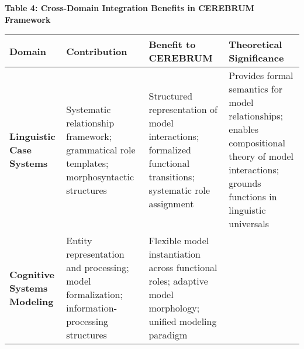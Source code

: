 \textbf{Table 4: Cross-Domain Integration Benefits in CEREBRUM
Framework}

\begin{longtable}[]{@{}llll@{}}
\toprule
\begin{minipage}[b]{0.10\columnwidth}\raggedright
Domain\strut
\end{minipage} & \begin{minipage}[b]{0.18\columnwidth}\raggedright
Contribution\strut
\end{minipage} & \begin{minipage}[b]{0.27\columnwidth}\raggedright
Benefit to CEREBRUM\strut
\end{minipage} & \begin{minipage}[b]{0.33\columnwidth}\raggedright
Theoretical Significance\strut
\end{minipage}\tabularnewline
\midrule
\endhead
\begin{minipage}[t]{0.10\columnwidth}\raggedright
\textbf{Linguistic Case Systems}\strut
\end{minipage} & \begin{minipage}[t]{0.18\columnwidth}\raggedright
Systematic relationship framework; grammatical role templates;
morphosyntactic structures\strut
\end{minipage} & \begin{minipage}[t]{0.27\columnwidth}\raggedright
Structured representation of model interactions; formalized functional
transitions; systematic role assignment\strut
\end{minipage} & \begin{minipage}[t]{0.33\columnwidth}\raggedright
Provides formal semantics for model relationships; enables compositional
theory of model interactions; grounds functions in linguistic
universals\strut
\end{minipage}\tabularnewline
\begin{minipage}[t]{0.10\columnwidth}\raggedright
\textbf{Cognitive Systems Modeling}\strut
\end{minipage} & \begin{minipage}[t]{0.18\columnwidth}\raggedright
Entity representation and processing; model formalization;
information-processing structures\strut
\end{minipage} & \begin{minipage}[t]{0.27\columnwidth}\raggedright
Flexible model instantiation across functional roles; adaptive model
morphology; unified modeling paradigm\strut
\end{minipage} & \begin{minipage}[t]{0.33\columnwidth}\raggedright

\end{minipage}
\end{longtable}
